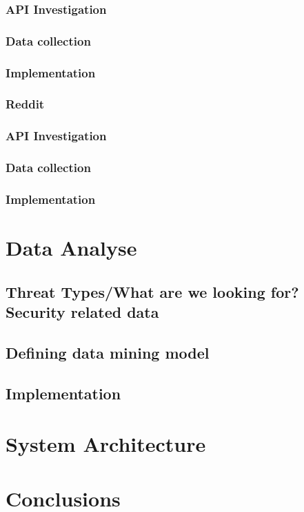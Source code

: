 \documentclass[12pt]{article}
\begin{document}
\subsubsection{API Investigation}
\subsubsection{Data collection}
\subsubsection{Implementation}
\subsubsection*{Reddit}
\subsubsection{API Investigation}
\subsubsection{Data collection}
\subsubsection{Implementation}

\newpage
\section{Data Analyse}
\subsection{Threat Types/What are we looking for? Security related data}
\subsection{Defining data mining model}
\subsection{Implementation}

\newpage
\section{System Architecture}
\newpage
\section*{Conclusions}
\newpage
\end{document}
